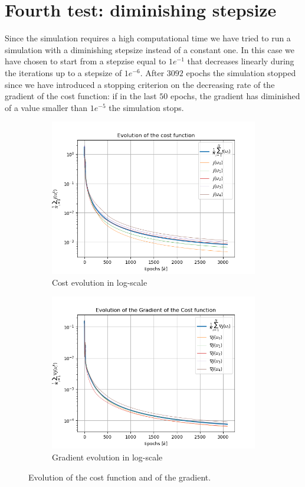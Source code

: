 \documentclass[a4paper,11pt,oneside]{book}
\begin{document}
\section{Fourth test: diminishing stepsize}
Since the simulation requires a high computational time we have tried to run a simulation with a diminishing stepsize instead of a constant one. In this case we have chosen to start from a stepzise equal to $1e^{-1}$ that decreases linearly during the iterations up to a stepsize of $1e^{-6}$.
After $3092$ epochs the simulation stopped since we have introduced a stopping criterion on the decreasing rate of the gradient of the cost function: if in the last $50$ epochs, the gradient has diminished of a value smaller than $1e^{-5}$ the simulation stops.

\begin{figure}[h]
\centering
	\begin{subfigure}{0.49\textwidth}	
	\includegraphics[width=\textwidth]{diminishing/J-log}
	\caption{Cost evolution in log-scale}
	\end{subfigure}
\hfill
	\begin{subfigure}{0.49\textwidth}	
	\includegraphics[width=\textwidth]{diminishing/norm_gradient_J}
	\caption{Gradient evolution in log-scale}
	\end{subfigure}
\caption{Evolution of the cost function and of the gradient.}
\label{diminish_cost_grad}
\end{figure}
\end{document}
